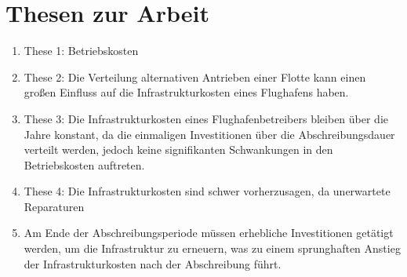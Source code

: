 \chapter*{Thesen zur Arbeit}
\label{ch:Thesen}
\thispagestyle{empty}

\begin{enumerate}
    \item These 1: Betriebskosten
    \item These 2: Die Verteilung alternativen Antrieben einer Flotte kann einen großen Einfluss auf die Infrastrukturkosten eines Flughafens haben.
    \item These 3: Die Infrastrukturkosten eines Flughafenbetreibers bleiben über die Jahre konstant, 
    da die einmaligen Investitionen über die Abschreibungsdauer verteilt werden, jedoch keine signifikanten Schwankungen in 
    den Betriebskosten auftreten.
    \item These 4: Die Infrastrukturkosten sind schwer vorherzusagen, da unerwartete Reparaturen 
    \item Am Ende der Abschreibungsperiode müssen erhebliche Investitionen getätigt werden, um die Infrastruktur zu erneuern, 
    was zu einem sprunghaften Anstieg der Infrastrukturkosten nach der Abschreibung führt.
\end{enumerate}